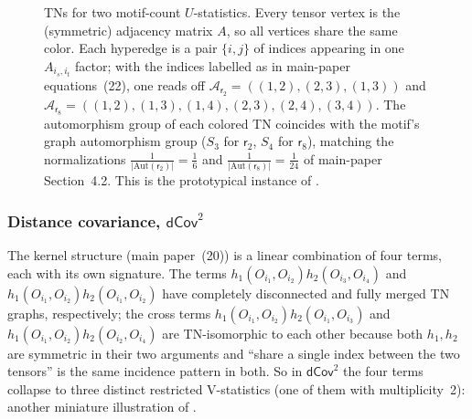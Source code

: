 \documentclass[11pt]{article}
\newcommand{\calA}{\mathcal{A}}
\newcommand{\Aut}{\mathrm{Aut}}
\newcommand{\sfr}{\mathsf{r}}
\theoremstyle{plain}
\theoremstyle{definition}
\begin{document}
\begin{figure}[ht]
\centering
{}
\caption{TNs for two motif-count $U$-statistics.  Every tensor vertex is
the (symmetric) adjacency matrix $A$, so all vertices share the same
color.  Each hyperedge is a pair $\{i,j\}$ of indices appearing in one
$A_{i_s,i_t}$ factor; with the indices labelled as in main-paper
equations~(22), one reads off
$\calA_{\sfr_2}=((1,2),(2,3),(1,3))$ and
$\calA_{\sfr_8}=((1,2),(1,3),(1,4),(2,3),(2,4),(3,4))$.
The automorphism group of each colored TN coincides with the motif's
graph automorphism group ($S_3$ for $\sfr_2$, $S_4$ for $\sfr_8$),
matching the normalizations $\tfrac1{|\Aut(\sfr_2)|}=\tfrac16$ and
$\tfrac1{|\Aut(\sfr_8)|}=\tfrac1{24}$ of main-paper Section~4.2.  This is the prototypical instance of
.}
\label{fig:tn-motifs}
\end{figure}

\subsubsection*{Distance covariance, $\mathsf{dCov}^2$}

The kernel structure (main paper~(20)) is a linear combination of four
terms, each with its own signature.  The terms
$h_1(O_{i_1},O_{i_2})h_2(O_{i_3},O_{i_4})$ and
$h_1(O_{i_1},O_{i_2})h_2(O_{i_1},O_{i_2})$ have completely disconnected and
fully merged TN graphs, respectively; the cross terms
$h_1(O_{i_1},O_{i_2})h_2(O_{i_1},O_{i_3})$ and
$h_1(O_{i_1},O_{i_2})h_2(O_{i_2},O_{i_4})$ are TN-isomorphic to each other
because both $h_1,h_2$ are symmetric in their two arguments and ``share a
single index between the two tensors'' is the same incidence pattern in
both.  So in $\mathsf{dCov}^2$ the four terms collapse to three distinct
restricted V-statistics (one of them with multiplicity~2): another
miniature illustration of .
\end{document}
